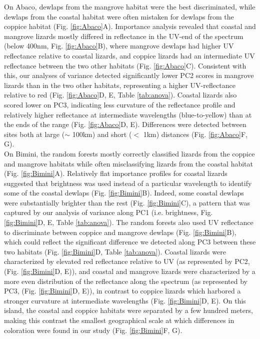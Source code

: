 On Abaco, dewlaps from the mangrove habitat were the best discriminated, while dewlaps from the coastal habitat were often mistaken for dewlaps from the coppice habitat (Fig. \ref{fig:Abaco}A). Importance analysis revealed that coastal and mangrove lizards mostly differed in reflectance in the UV-end of the spectrum (below 400nm, Fig. \ref{fig:Abaco}B), where mangrove dewlaps had higher UV reflectance relative to coastal lizards, and coppice lizards had an intermediate UV reflectance between the two other habitats (Fig. \ref{fig:Abaco}C). Consistent with this, our analyses of variance detected significantly lower PC2 scores in mangrove lizards than in the two other habitats, representing a higher UV-reflectance relative to red (Fig. \ref{fig:Abaco}D, E, Table \ref{tab:anova}). Coastal lizards also scored lower on PC3, indicating less curvature of the reflectance profile and relatively higher reflectance at intermediate wavelengths (blue-to-yellow) than at the ends of the range (Fig. \ref{fig:Abaco}D, E). Differences were detected between sites both at large ($\sim$ 100km) and short ($<$ 1km) distances (Fig. \ref{fig:Abaco}F, G).\\

On Bimini, the random forests mostly correctly classified lizards from the coppice and mangrove habitats while often misclassifying lizards from the coastal habitat (Fig. \ref{fig:Bimini}A). Relatively flat importance profiles for coastal lizards suggested that brightness was used instead of a particular wavelength to identify some of the coastal dewlaps (Fig. \ref{fig:Bimini}B). Indeed, some coastal dewlaps were substantially brighter than the rest (Fig. \ref{fig:Bimini}C), a pattern that was captured by our analysis of variance along PC1 (i.e. brightness, Fig. \ref{fig:Bimini}D, E, Table \ref{tab:anova}). The random forests also used UV reflectance to discriminate between coppice and mangrove dewlaps (Fig. \ref{fig:Bimini}B), which could reflect the significant difference we detected along PC3 between these two habitats (Fig. \ref{fig:Bimini}D, Table \ref{tab:anova}). Coastal lizards were characterized by elevated red reflectance relative to UV (as represented by PC2, (Fig. \ref{fig:Bimini}D, E)), and coastal and mangrove lizards were characterized by a more even distribution of the reflectance along the spectrum (as represented by PC3, (Fig. \ref{fig:Bimini}D, E)), in contrast to coppice lizards which harbored a stronger curvature at intermediate wavelengths (Fig. \ref{fig:Bimini}D, E). On this island, the coastal and coppice habitats were separated by a few hundred meters, making this contrast the smallest geographical scale at which differences in coloration were found in our study (Fig. \ref{fig:Bimini}F, G).\\

